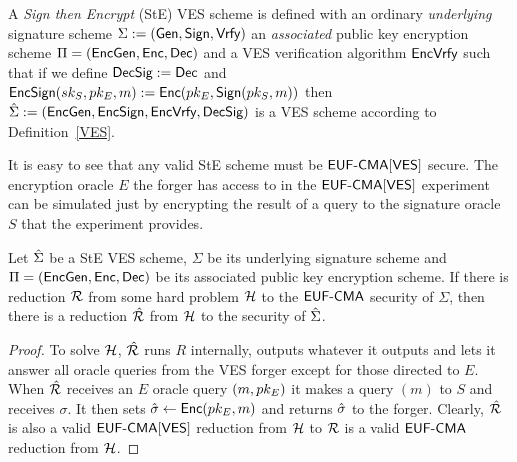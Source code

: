 \begin{definition}
A \emph{Sign then Encrypt} (StE) VES scheme is defined with an ordinary \emph{underlying} signature scheme $\Sigma := (\textsf{Gen}, \textsf{Sign}, \textsf{Vrfy})$ an \emph{associated} public key encryption scheme $\Pi = (\textsf{EncGen}, \textsf{Enc}, \textsf{Dec})$ and a VES verification algorithm $\textsf{EncVrfy}$ such that if we define $\textsf{DecSig} := \textsf{Dec}$ and $\textsf{EncSign}(sk_S, pk_E, m) := \textsf{Enc}(pk_E, \textsf{Sign}(pk_S, m))$ then $\hat{\Sigma} := (\textsf{EncGen}, \textsf{EncSign}, \textsf{EncVrfy}, \textsf{DecSig})$ is a VES scheme according to Definition~\ref{VES}.
\end{definition}

It is easy to see that any valid StE scheme must be $\textsf{EUF-CMA}[\textsf{VES}]$ secure.
The encryption oracle $E$ the forger has access to in the $\textsf{EUF-CMA}[\textsf{VES}]$ experiment can be simulated just by encrypting the result of a query to the signature oracle $S$ that the \EUFCMA experiment provides.

\begin{theorem}
Let $\hat{\Sigma}$ be a StE VES scheme,  $\Sigma$ be its underlying signature scheme and $\Pi = (\textsf{EncGen}, \textsf{Enc}, \textsf{Dec})$ be its associated public key encryption scheme.
If there is reduction $\mathcal{R}$ from some hard problem $\mathcal{H}$ to the $\textsf{EUF-CMA}$ security of $\Sigma$, then there is a reduction $\hat{\mathcal{R}}$ from $\mathcal{H}$ to the \EUFCMAVES security of $\hat{\Sigma}$.
\end{theorem}

\begin{proof}
  To solve $\mathcal{H}$, $\hat{\mathcal{R}}$ runs $R$ internally, outputs whatever it outputs and lets it answer all oracle queries from the VES forger except for those directed to $E$.
  When $\hat{\mathcal{R}}$ receives an $E$ oracle query $(m, pk_E)$ it makes a query $(m)$ to $S$ and receives $\sigma$.
  It then sets $\hat{\sigma} \gets \textsf{Enc}(pk_E, m)$ and returns $\hat{\sigma}$ to the forger.
  Clearly, $\hat{\mathcal{R}}$ is also a valid $\textsf{EUF-CMA}[\textsf{VES}]$ reduction from $\mathcal{H}$ to $\mathcal{R}$ is a valid $\textsf{EUF-CMA}$ reduction from $\mathcal{H}$.
\end{proof}
